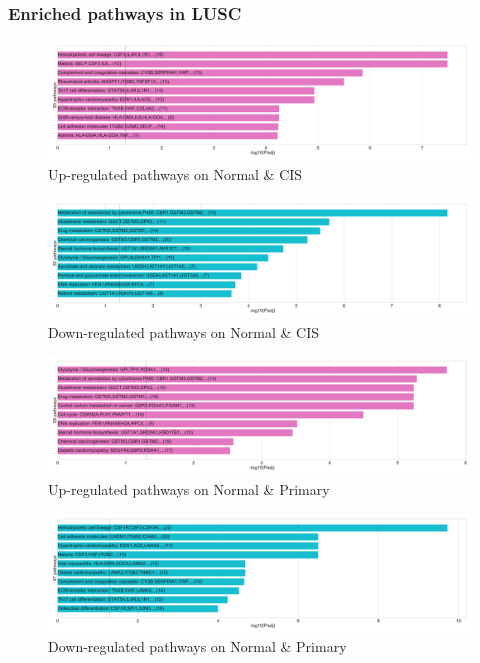 \documentclass{beamer}
\begin{document}
                \begin{frame}[allowframebreaks]
                    \frametitle{Enriched pathways in LUSC}

                    \begin{figure}
                        \includegraphics[width=0.6 \linewidth]{figures/DEG/Enrichment/STAR.TPM.SQC.Normal-CIS.Up.KEGG.pdf}
                        \caption{Up-regulated pathways on Normal \& CIS}
                    \end{figure}

                    \begin{figure}
                        \includegraphics[width=0.6 \linewidth]{figures/DEG/Enrichment/STAR.TPM.SQC.Normal-CIS.Down.KEGG.pdf}
                        \caption{Down-regulated pathways on Normal \& CIS}
                    \end{figure}

                    \begin{figure}
                        \includegraphics[width=0.6 \linewidth]{figures/DEG/Enrichment/STAR.TPM.SQC.Normal-Primary.Up.KEGG.pdf}
                        \caption{Up-regulated pathways on Normal \& Primary}
                    \end{figure}

                    \begin{figure}
                        \includegraphics[width=0.6 \linewidth]{figures/DEG/Enrichment/STAR.TPM.SQC.Normal-Primary.Down.KEGG.pdf}
                        \caption{Down-regulated pathways on Normal \& Primary}
                    \end{figure}
                \end{frame}
\end{document}
